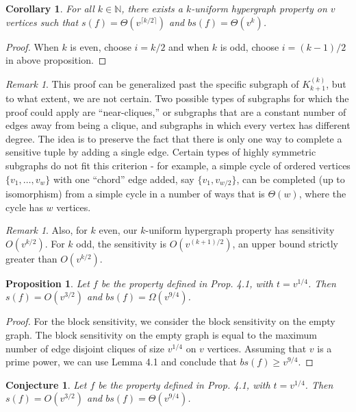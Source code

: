 \documentclass[psamsfonts]{amsart}
\newtheorem{cor}[theorem]{Corollary}
\newtheorem{prop}[theorem]{Proposition}
\newtheorem{conj}{Conjecture}
\theoremstyle{definition}
\theoremstyle{remark}
\newtheorem{rem}[theorem]{Remark}
\numberwithin{equation}{section}
\begin{document}
	\begin{cor}
		For all $k \in \mathbb{N}$, there exists a $k$-uniform hypergraph property on $v$ vertices such that $s(f) = \Theta(v^{\lceil k/2 \rceil})$ and $bs(f)= \Theta (v^k)$.
	\end{cor}
	\begin{proof}
		When $k$ is even, choose $i=k/2$ and when $k$ is odd, choose $i=(k-1)/2$ in above proposition.
	\end{proof}
	
	\begin{rem}
		This proof can be generalized past the specific subgraph of  $K_{k+1}^{(k)}$, but to what extent, we are not certain.  Two possible types of subgraphs for which the proof could apply are ``near-cliques,'' or subgraphs that are a constant number of edges away from being a clique, and subgraphs in which every vertex has different degree.  The idea is to preserve the fact that there is only one way to complete a sensitive tuple by adding a single edge.  Certain types of highly symmetric subgraphs do not fit this criterion - for example, a simple cycle of ordered vertices $\{v_1, \ldots , v_w\}$ with one ``chord'' edge added, say $\{v_1,v_{w/2}\}$, can be completed (up to isomorphism) from a simple cycle in a number of ways that is $\Theta(w)$, where the cycle has $w$ vertices.  
	\end{rem}
	
	\begin{rem}
		Also, for $k$ even, our $k$-uniform hypergraph property has sensitivity $O(v^{k/2})$.  For $k$ odd, the sensitivity is $O(v^{(k+1)/2})$, an upper bound strictly greater than $O(v^{k/2})$.
	\end{rem}

\begin{prop}
		Let $f$ be the property defined in Prop. 4.1, with $t = v^{1/4}$. Then $s(f) = O(v^{3/2})$ and $bs(f) = \Omega(v^{9/4})$.
	\end{prop}
	
	\begin{proof}
		For the block sensitivity, we consider the block sensitivity on the empty graph. The block sensitivity on the empty graph is equal to the maximum number of edge disjoint cliques of size $v^{1/4}$ on $v$ vertices. Assuming that $v$ is a prime power, we can use Lemma 4.1 and conclude that $bs(f) \geq v^{9/4}$.
	\end{proof}
	\begin{conj}
		Let $f$ be the property defined in Prop. 4.1, with $t = v^{1/4}$. Then  $s(f) = O(v^{3/2})$ and $bs(f) = \Theta(v^{9/4})$.
	\end{conj}
	
\end{document}
